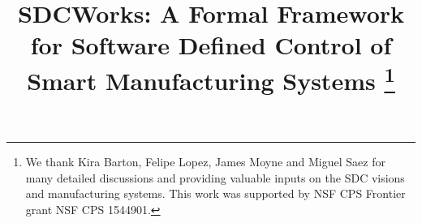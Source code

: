 \documentclass[conference]{IEEEtran}
\begin{document}
\title{SDCWorks: A Formal Framework for Software Defined Control  of Smart Manufacturing Systems
\thanks{We thank Kira Barton, Felipe Lopez, James Moyne and Miguel Saez for many detailed discussions and providing valuable inputs on the SDC visions and manufacturing systems. This work was supported by NSF CPS Frontier grant NSF CPS 1544901.}}
\author{
}

\maketitle

\thispagestyle{plain}
\pagestyle{plain}

\begin{abstract}

\end{abstract}















%

%
%


\end{document}
